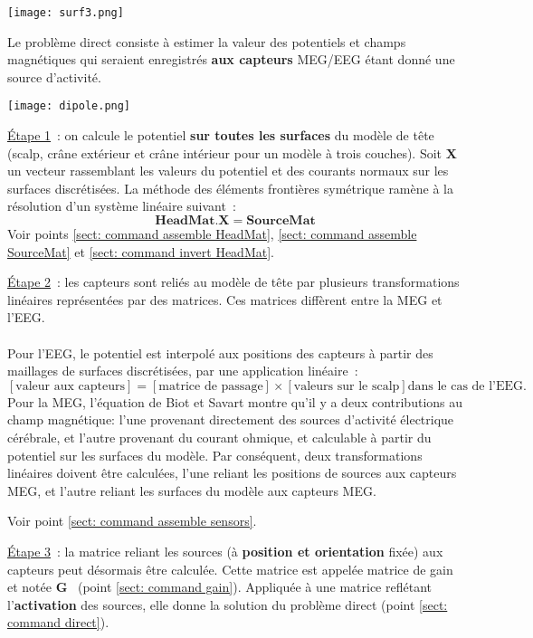 \centerline{\texttt{[image: surf3.png]}}

\noindent
Le problème direct consiste à estimer la valeur des potentiels et champs magnétiques qui seraient enregistrés \textbf{aux
capteurs} MEG/EEG étant donné une source d'activité.

\centerline{\texttt{[image: dipole.png]}}

\noindent
\underline{Étape 1}~: on calcule le potentiel \textbf{sur toutes les surfaces } du modèle de tête (scalp, crâne extérieur et crâne intérieur pour un modèle à trois couches). Soit $\mathbf{X}$ un vecteur rassemblant  les valeurs du potentiel et des courants normaux sur les surfaces discrétisées. La méthode des éléments
frontières symétrique ramène à la résolution d'un système linéaire
suivant~:
\[
    \mathbf{HeadMat} . \mathbf{X} = \mathbf{SourceMat}
\]
Voir points \ref{sect: command assemble HeadMat}, \ref{sect: command assemble SourceMat} et \ref{sect: command invert HeadMat}.

\medskip

\noindent
\underline{Étape 2}~: les capteurs sont reliés au modèle de tête par plusieurs transformations linéaires représentées par des matrices. Ces matrices diffèrent entre la MEG et l'EEG. \\
\\
Pour l'EEG, le potentiel est interpolé aux positions des capteurs à partir des maillages de surfaces discrétisées, par une application linéaire~:\\
\[
    \left[ \mbox{valeur aux capteurs} \right] =
    \left[ \mbox{matrice de passage} \right] \times \left[ \mbox{valeurs sur le scalp} \right] \mbox{dans le cas de l'EEG.}
\]
Pour la MEG, l'équation de Biot et Savart montre qu'il y a deux contributions au champ magnétique: l'une provenant directement des sources d'activité électrique cérébrale, et l'autre provenant du courant ohmique, et calculable à partir du potentiel sur les surfaces du modèle.
Par conséquent, deux transformations linéaires doivent être calculées, l'une reliant les positions de sources aux capteurs MEG, et l'autre reliant les surfaces du modèle aux capteurs MEG.

Voir point \ref{sect: command assemble sensors}.

\medskip

\noindent
\underline{Étape 3}~: la matrice reliant les sources (à \textbf{position et orientation} fixée)  aux capteurs peut désormais être calculée. Cette matrice
est appelée matrice de gain et notée $\mathbf{G}$~ (point \ref{sect: command gain}). 
Appliquée à une matrice reflétant l'\textbf{activation} des sources, elle donne la solution du problème direct (point
\ref{sect: command direct}).
